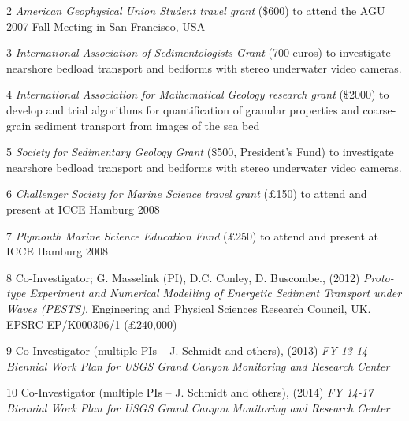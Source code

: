 \documentclass[margin,line]{resume}
\begin{document}
\begin{resume}
\begin{footnotesize}
\begin{list1}
	\item[2] {\sl American Geophysical Union Student travel grant} ($\$$600) to attend the AGU 2007 Fall Meeting in San Francisco, USA\\
	
	\item[3] {\sl International Association of Sedimentologists Grant} (700 euros) to investigate nearshore bedload transport and bedforms with stereo underwater video cameras.\\
	
	\item[4] {\sl International Association for Mathematical Geology research grant} ($\$$2000) to develop and trial algorithms for quantification of granular properties and coarse-grain sediment transport from images of the sea bed\\
	
	\item[5] {\sl Society for Sedimentary Geology Grant} ($\$$500, President's Fund) to investigate nearshore bedload transport and bedforms with stereo underwater video cameras.\\
	
	\item[6] {\sl Challenger Society for Marine Science travel grant} ($\pounds$150) to attend and present at ICCE Hamburg 2008\\
	
	\item[7] {\sl Plymouth Marine Science Education Fund} ($\pounds$250) to attend and present at ICCE Hamburg 2008\\

	\item[8] Co-Investigator; G. Masselink (PI), D.C. Conley, D. Buscombe., (2012) {\sl Proto-type Experiment and Numerical Modelling of Energetic Sediment Transport under Waves (PESTS)}. Engineering and Physical Sciences Research Council, UK. EPSRC EP/K000306/1 ($\pounds$240,000)\\

	\item[9] Co-Investigator (multiple PIs – J. Schmidt and others), (2013) {\sl FY 13-14 Biennial Work Plan for USGS Grand Canyon Monitoring and Research Center}\\

	\item[10] Co-Investigator (multiple PIs – J. Schmidt and others), (2014) {\sl FY 14-17 Biennial Work Plan for USGS Grand Canyon Monitoring and Research Center}


\end{list1}
\end{footnotesize}
\end{resume}
\end{document}

